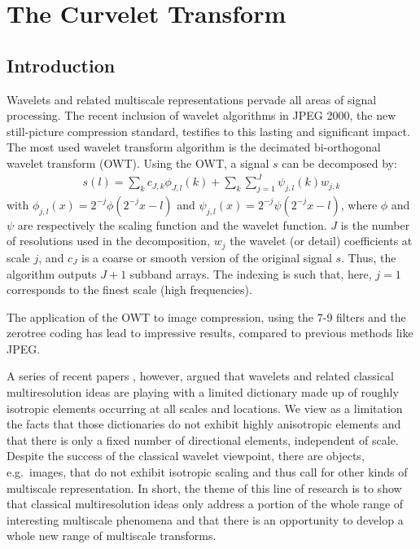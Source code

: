 \chapter{The Curvelet Transform}
\section{Introduction}
 Wavelets and related multiscale representations pervade  all
areas of signal processing. The recent inclusion of wavelet algorithms
in JPEG 2000, the new still-picture compression standard, testifies
to this lasting and significant impact.  
The most used
wavelet transform algorithm is the decimated bi-orthogonal
wavelet transform (OWT). Using the OWT, a signal $s$ can be decomposed
by:
\begin{eqnarray}
  s(l) = \sum_{k} c_{J,k} \phi_{J,l}(k) 
        +  \sum_{k} \sum_{j=1}^J \psi_{j,l}(k) w_{j,k}
 \end{eqnarray}
 with $\phi_{j,l}(x) = 2^{-j} \phi(2^{-j}x-l)$ and $\psi_{j,l}(x) =
 2^{-j} \psi(2^{-j}x-l)$, where $\phi$ and $\psi$ are respectively the
 scaling function and the wavelet function.  $J$ is the number of
 resolutions used in the decomposition, $w_{j}$ the wavelet (or
 detail) coefficients at scale $j$, and $c_{J}$ is a coarse or smooth
 version of the original signal $s$.  Thus, the algorithm outputs $J+1$
 subband arrays.  The indexing is such that, here, $j = 1$ corresponds
 to the finest scale (high frequencies).

The application of the OWT to image compression, using the 7-9 filters
 \cite{wave:antonini92} and the zerotree coding
\cite{compress:shapiro93,compress:said96} has lead to impressive
results, compared to previous methods like JPEG.   

A series of recent papers
\cite{Roysoc,Curvelets-StMalo}, however, argued that wavelets and related
classical multiresolution ideas are playing with a limited dictionary
made up of roughly isotropic elements occurring at all scales and
locations. We view as a limitation the facts that those dictionaries
do not exhibit highly anisotropic elements and that there is only a
fixed number of directional elements, independent of scale.  
Despite the success of the classical wavelet viewpoint, there are objects, 
e.g.\  images, that do
not exhibit isotropic scaling and thus call for other kinds of
multiscale representation. In short, the theme of this line of
research is to show that classical multiresolution ideas only address
a portion of the whole range of interesting multiscale phenomena and
that there is an opportunity to develop a whole new range of
multiscale transforms.

